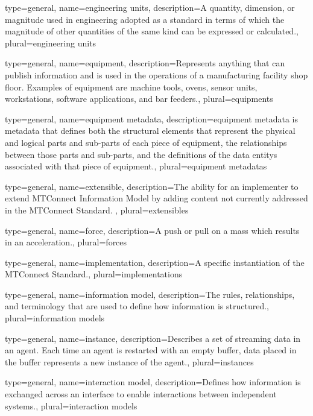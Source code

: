 {
	type={general},
    name={engineering units},
	description={A quantity, dimension, or magnitude used in engineering adopted as a standard in terms of which the magnitude of other quantities of the same kind can be expressed or calculated.},
	plural={engineering units}
}

{
	type={general},
    name={equipment},
	description={Represents anything that can publish information and is used in the operations of a manufacturing facility shop floor.  Examples of equipment are machine tools, ovens, sensor units, workstations, software applications, and bar feeders.},
	plural={equipments}
}

{
	type={general},
    name={equipment metadata},
	description={\gls{equipment metadata} is \gls{metadata} that defines both the \glspl{structural element} that represent the physical and logical parts and sub-parts of each piece of equipment, the relationships between those parts and sub-parts, and the definitions of the \glspl{data entity} associated with that piece of equipment.},
	plural={equipment metadatas}
}

{
	type={general},
    name={extensible},
	description={The ability for an implementer to extend \gls{MTConnect Information Model} by adding content not currently addressed in the MTConnect Standard.
},
	plural={extensibles}
}

{
	type={general},
    name={force},
	description={A push or pull on a mass which results in an acceleration.},
	plural={forces}
}

{
	type={general},
    name={implementation},
	description={A specific instantiation of the MTConnect Standard.},
	plural={implementations}
}

{
	type={general},
    name={information model},
	description={The rules, relationships, and terminology that are used to define how information is structured.},
	plural={information models}
}

{
	type={general},
    name={instance},
	description={Describes a set of \gls{streaming data} in an \gls{agent}.  Each time an \gls{agent} is restarted with an empty \gls{buffer}, data placed in the \gls{buffer} represents a new \gls{instance} of the \gls{agent}.},
	plural={instances}
}

{
	type={general},
    name={interaction model},
	description={Defines how information is exchanged across an \gls{interface} to enable interactions between independent systems.},
	plural={interaction models}
}

